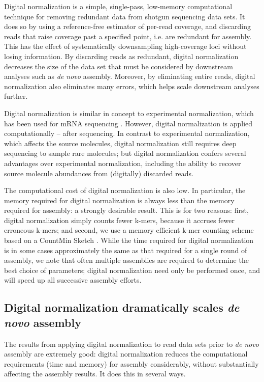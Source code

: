 \documentclass[10pt]{article}
\begin{document}
Digital normalization is a simple, single-pass, low-memory
computational technique for removing redundant data from shotgun
sequencing data sets.  It does so by using a reference-free estimator
of per-read coverage, and discarding reads that raise coverage past a
specified point, i.e. are redundant for assembly.  This has the effect
of systematically downsampling high-coverage loci
without losing information.  By discarding reads as redundant,
digital normalization decreases the size of the data set that must be
considered by downstream analyses such as {\em de novo} assembly.
Moreover, by eliminating entire reads, digital normalization also
eliminates many errors, which helps scale downstream analyses further.

Digital normalization is similar in concept to experimental
normalization, which has been used for mRNA sequencing
\cite{pubmed8889548,pubmed7937745}. However, digital normalization is
applied computationally -- after sequencing.  In contrast to
experimental normalization, which affects the source molecules, digital
normalization still requires deep sequencing to sample rare molecules;
but digital normalization confers several advantages over experimental
normalization, including the ability to recover source molecule
abundances from (digitally) discarded reads.

The computational cost of digital normalization is also low.  In
particular, the memory required for digital normalization is always
less than the memory required for assembly: a strongly desirable
result.  This is for two reasons: first, digital normalization simply
counts fewer k-mers, because it accrues fewer erroneous k-mers; and
second, we use a memory efficient k-mer counting scheme based on a
CountMin Sketch \cite{CountMinSketch}.  While the time required for
digital normalization is in some cases approximately the same as that
required for a single round of assembly, we note that often multiple
assemblies are required to determine the best choice of parameters;
digital normalization need only be performed once, and will speed up
all successive assembly efforts.

\subsection*{Digital normalization dramatically scales {\em de novo} assembly}

The results from applying digital normalization to read data sets
prior to {\em de novo} assembly are extremely good: digital normalization
reduces the computational requirements (time and memory) for assembly
considerably, without substantially affecting the assembly results.
It does this in several ways.
\end{document}
